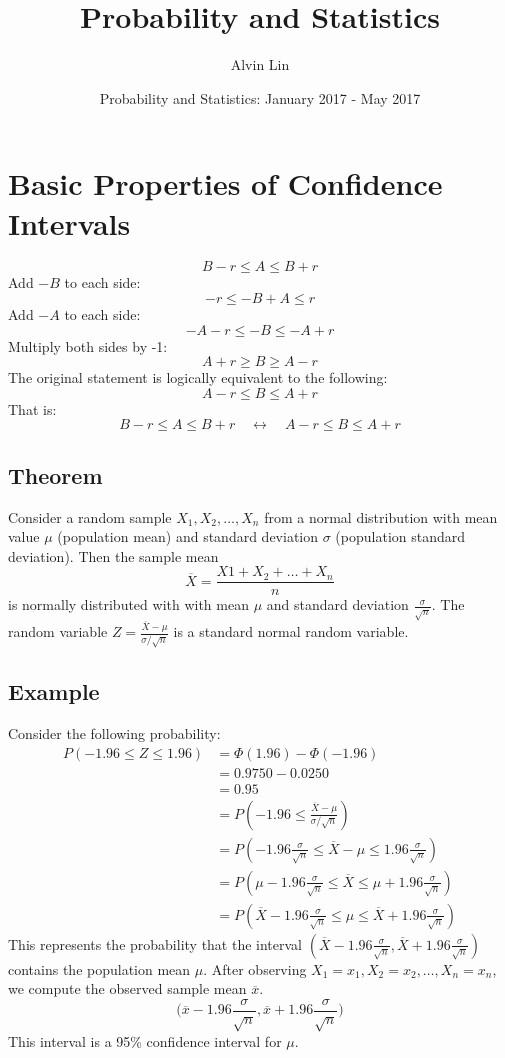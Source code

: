 \documentclass[letterpaper, 12pt]{math}
\title{Probability and Statistics}
\author{Alvin Lin}
\date{Probability and Statistics: January 2017 - May 2017}
\begin{document}
\maketitle

\section*{Basic Properties of Confidence Intervals}
\[ B-r\leq A\leq B+r \]
Add \( -B \) to each side:
\[ -r\leq -B+A\leq r \]
Add \( -A \) to each side:
\[ -A-r\leq -B\leq -A+r \]
Multiply both sides by -1:
\[ A+r\geq B\geq A-r \]
The original statement is logically equivalent to the following:
\[ A-r\leq B\leq A+r \]
That is:
\[ B-r\leq A\leq B+r \quad\leftrightarrow\quad A-r\leq B\leq A+r \]

\subsection*{Theorem}
Consider a random sample \( X_{1},X_{2},\dots,X_{n} \) from a normal
distribution with mean value \( \mu \) (population mean) and standard deviation
\( \sigma \) (population standard deviation). Then the sample mean
\[ \overline{X} = \frac{X{1}+X_{2}+\dots+X_{n}}{n} \]
is normally distributed with with mean \( \mu \) and standard deviation
\( \frac{\sigma}{\sqrt{n}} \). The random variable
\( Z = \frac{\overline{X}-\mu}{\sigma/\sqrt{n}} \) is a standard normal random
variable. \par

\subsection*{Example}
Consider the following probability:
\begin{align*}
  P(-1.96\leq Z\leq 1.96) &= \Phi(1.96)-\Phi(-1.96) \\
  &= 0.9750-0.0250 \\
  &= 0.95 \\
  &= P(-1.96\leq\frac{\overline{X}-\mu}{\sigma/\sqrt{n}}) \\
  &= P(-1.96\frac{\sigma}{\sqrt{n}}\leq
    \overline{X}-\mu\leq1.96\frac{\sigma}{\sqrt{n}}) \\
  &= P(\mu-1.96\frac{\sigma}{\sqrt{n}}\leq\overline{X}
    \leq\mu+1.96\frac{\sigma}{\sqrt{n}}) \\
  &= P(\overline{X}-1.96\frac{\sigma}{\sqrt{n}}\leq\mu
    \leq\overline{X}+1.96\frac{\sigma}{\sqrt{n}})
\end{align*}
This represents the probability that the interval \( (\overline{X}
-1.96\frac{\sigma}{\sqrt{n}},\overline{X}+1.96\frac{\sigma}{\sqrt{n}}) \)
contains the population mean \( \mu \). After observing
\( X_{1}=x_{1},X_{2}=x_{2},\dots,X_{n}=x_{n} \), we compute the
observed sample mean \( \overline{x} \).
\[ \bigg(\overline{x}-1.96\frac{\sigma}{\sqrt{n}},
   \overline{x}+1.96\frac{\sigma}{\sqrt{n}}\bigg) \]
This interval is a 95\% confidence interval for \( \mu \).
\end{document}
